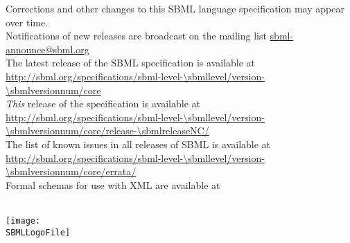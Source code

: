 \begin{center}\sffamily
Corrections and other changes to this SBML language specification may appear over time.\\
Notifications of new releases are broadcast on the mailing list \href{http://www.sbml.org/forums}{sbml-announce@sbml.org}\\[10pt]

The latest release of the SBML \thisLV specification is available at\\
\url{http://sbml.org/specifications/sbml-level-\sbmllevel/version-\sbmlversionnum/core}\\[10pt]

\emph{This} release of the specification is available at\\
\url{http://sbml.org/specifications/sbml-level-\sbmllevel/version-\sbmlversionnum/core/release-\sbmlreleaseNC/}\\[10pt]

The list of known issues in all releases of SBML \thisLV is available at\\
\url{http://sbml.org/specifications/sbml-level-\sbmllevel/version-\sbmlversionnum/core/errata/}\\[10pt]

Formal schemas for use with XML are available at\\
\sbmlSchemasURL\\[10pt]
\end{center}

\vfill

\centerline{\texttt{[image: \\SBMLLogoFile]}}

